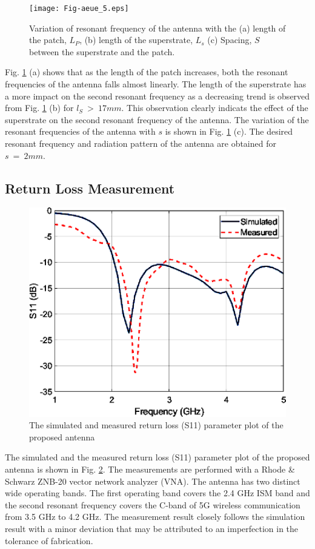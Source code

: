 \begin{figure}[h]
\centering
\texttt{[image: Fig-aeue\_5.eps]}
\caption{Variation of resonant frequency of the antenna with the (a) length of the patch, $L_P$, (b) length of the superstrate, $L_s$ (c) Spacing, $S$ between the superstrate and the patch.}\label{fig-vars}
\end{figure}

Fig. \ref{fig-vars} (a) shows that as the length of the patch increases, both the resonant frequencies of the antenna falls almost linearly. The length of the superstrate has a more impact on the second resonant frequency as a decreasing trend is observed from Fig. \ref{fig-vars} (b) for $l_S~>~17mm$. This observation clearly indicats the effect of the superstrate on the second resonant frequency of the antenna. The variation of the resonant frequencies of the antenna with $s$ is shown in Fig. \ref{fig-vars} (c). The desired resonant frequency and radiation pattern of the antenna are obtained for $s~=~2mm$.

\subsection{Return Loss Measurement}
\begin{figure}
\centering
\includegraphics[width=0.5\linewidth]{Fig-aeue_6.eps}
\caption{The simulated and measured return loss (S11) parameter plot of the proposed antenna}\label{fig-s11}
\end{figure}

The simulated and the measured return loss (S11) parameter plot of the proposed antenna is shown in Fig. \ref{fig-s11}. The measurements are performed with a Rhode \& Schwarz ZNB-20 vector network analyzer (VNA). The antenna has two distinct wide operating bands. The first operating band covers the 2.4 GHz ISM band and the second resonant frequency covers the C-band of 5G wireless communication from 3.5 GHz to 4.2 GHz. The measurement result closely follows the simulation result with a minor deviation that may be attributed to an imperfection in the tolerance of fabrication.

